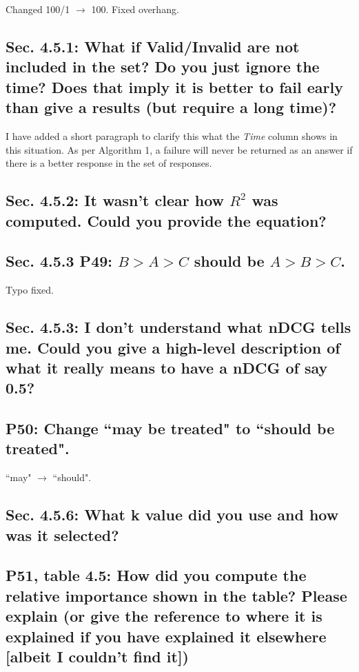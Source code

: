 \documentclass[]{article}
\begin{document}
Changed 100/1 $\rightarrow$ 100. Fixed overhang.

\subsection{Sec. 4.5.1: What if Valid/Invalid are not included in the set? Do you just ignore the time? Does that imply it is better to fail early than give a results (but require a long time)?}

I have added a short paragraph to clarify this what the \textit{Time} column shows in this situation. 
As per Algorithm 1, a failure will never be returned as an answer if there is a better response in the set of responses. 

\subsection{Sec. 4.5.2: It wasn't clear how $R^{2}$ was computed. Could you provide the equation?}

\subsection{Sec. 4.5.3 P49: $B > A > C$ should be $A > B > C$.}

Typo fixed.

\subsection{Sec. 4.5.3: I don't understand what nDCG tells me. Could you give a high-level description of what it really means to have a nDCG of say 0.5?}

\subsection{P50: Change ``may be treated" to ``should be treated".} 

``may" $\rightarrow$ ``should".
	
\subsection{Sec. 4.5.6: What k value did you use and how was it selected?}

\subsection{P51, table 4.5: How did you compute the relative importance shown in the table? Please explain (or give the reference to where it is explained if you have explained it elsewhere [albeit I couldn't find it])}
\end{document}
